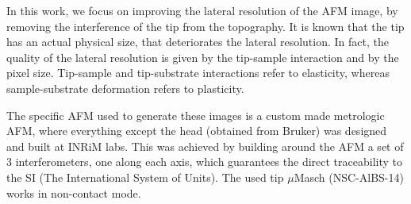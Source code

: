In this work, we focus on improving the lateral resolution of the AFM image, by removing the interference of the tip from the topography. It is known that the tip has an actual physical size, that deteriorates the lateral resolution. In fact, the quality of the lateral resolution is given by the tip-sample interaction and by the pixel size. Tip-sample and tip-substrate interactions refer to elasticity, whereas sample-substrate deformation refers to plasticity. 
    
The specific AFM used to generate these images is a custom made metrologic AFM, where everything except the head (obtained from Bruker) was designed and built at INRiM labs. This was achieved by building around the AFM a set of 3 interferometers, one along each axis, which guarantees the direct traceability to the SI (The International System of Units). The used tip $\mu$Masch (NSC-AlBS-14) \cite{ribotta3} works in non-contact mode.
